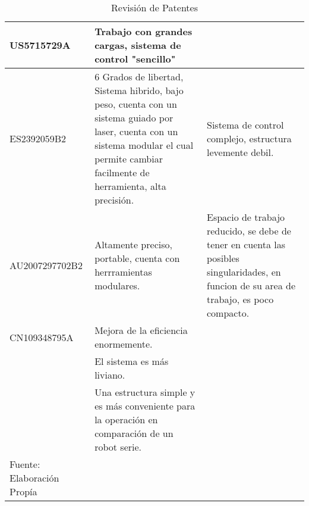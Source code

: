 \begin{longtable}{|>{\columncolor[gray]{0.85}}p{}|p{}|p{}|}
US5715729A & Trabajo con grandes cargas, sistema de control "sencillo" & \\ \cline{1-3}

ES2392059B2 & 6 Grados de libertad, Sistema hibrido, bajo peso, cuenta con un sistema guiado por laser, cuenta con un sistema modular el cual permite cambiar facilmente de herramienta, alta precisión.
 & Sistema de control complejo, estructura levemente debil.  \\ \cline{1-3}

AU2007297702B2 & Altamente preciso, portable, cuenta con herrramientas modulares. & Espacio de trabajo reducido, se debe de tener en cuenta las posibles singularidades, en funcion de su area de trabajo, es poco compacto.\\ \cline{1-3}


CN109348795A & Mejora de la eficiencia enormemente. & \\
 & El sistema es más liviano. & \\
 & Una estructura simple y es más conveniente para la operación en comparación de un robot serie. & \\ \cline{1-3}
 
\caption{Revisión de Patentes}{Fuente: Elaboración Propía}
\label{table:PatentRevision}
\end{longtable}